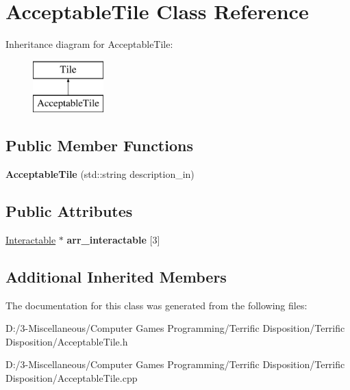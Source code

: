 \hypertarget{class_acceptable_tile}{}\section{Acceptable\+Tile Class Reference}
\label{class_acceptable_tile}
Inheritance diagram for Acceptable\+Tile\+:\begin{figure}[H]
\begin{center}
\leavevmode
\includegraphics[height=2.000000cm]{class_acceptable_tile}
\end{center}
\end{figure}
\subsection*{Public Member Functions}
\begin{DoxyCompactItemize}
\item 
\mbox{\label{class_acceptable_tile_aeb814130e94f5a5d1fdf8a619543d547}} 
{\bfseries Acceptable\+Tile} (std\+::string description\+\_\+in)
\end{DoxyCompactItemize}
\subsection*{Public Attributes}
\begin{DoxyCompactItemize}
\item 
\mbox{\label{class_acceptable_tile_aee4f719eb3b63500d749ab2ab3c2ef28}} 
\hyperlink{class_interactable}{Interactable} $\ast$ {\bfseries arr\+\_\+interactable} \mbox{[}3\mbox{]}
\end{DoxyCompactItemize}
\subsection*{Additional Inherited Members}


The documentation for this class was generated from the following files\+:\begin{DoxyCompactItemize}
\item 
D\+:/3-\/\+Miscellaneous/\+Computer Games Programming/\+Terrific Disposition/\+Terrific Disposition/Acceptable\+Tile.\+h\item 
D\+:/3-\/\+Miscellaneous/\+Computer Games Programming/\+Terrific Disposition/\+Terrific Disposition/Acceptable\+Tile.\+cpp\end{DoxyCompactItemize}
